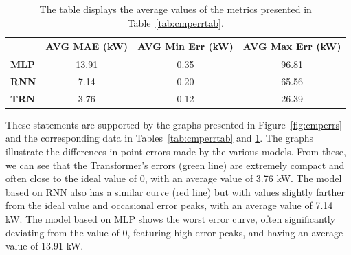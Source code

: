 \begin{table}[H]
	\centering
	\begin{tabular}{l|c|c|c}
		             & \textbf{AVG MAE (kW)} & \textbf{AVG Min Err (kW)} & \textbf{AVG Max Err (kW)} \\
		\hline
		\textbf{MLP} & 13.91                 & 0.35                      & 96.81                     \\
		\textbf{RNN} & 7.14                  & 0.20                      & 65.56                     \\
		\textbf{TRN} & 3.76                  & 0.12                      & 26.39
	\end{tabular}
	\caption{The table displays the average values of the metrics presented in Table~\ref{tab:cmperrtab}.}
	\label{tab:cmpavgdiffs}
\end{table}

These statements are supported by the graphs presented in Figure~\ref{fig:cmperrs} and the corresponding data in Tables~\ref{tab:cmperrtab} and \ref{tab:cmpavgdiffs}. The graphs illustrate the differences in point errors made by the various models. From these, we can see that the Transformer's errors (green line) are extremely compact and often close to the ideal value of 0, with an average value of 3.76 kW. The model based on RNN also has a similar curve (red line) but with values slightly farther from the ideal value and occasional error peaks, with an average value of 7.14 kW. The model based on MLP shows the worst error curve, often significantly deviating from the value of 0, featuring high error peaks, and having an average value of 13.91 kW.

